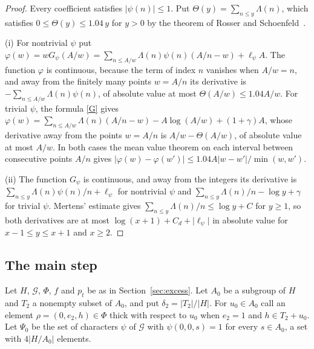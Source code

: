 \begin{proof}
Every coefficient satisfies $\lvert\psi(n)\rvert\le1$. Put $\Theta(y)=\sum_{n\le y}\Lambda(n)$, which satisfies $0\le\Theta(y)\le1.04\,y$ for $y>0$ by the theorem of Rosser and Schoenfeld~\cite[Theorem~12]{rosserschoenfeld}.

(i) For nontrivial $\psi$ put $\varphi(w)=wG_\psi(A/w)=\sum_{n\le A/w}\Lambda(n)\psi(n)(A/n-w)+\ell_\psi A$. The function $\varphi$ is continuous, because the term of index $n$ vanishes when $A/w=n$, and away from the finitely many points $w=A/n$ its derivative is $-\sum_{n\le A/w}\Lambda(n)\psi(n)$, of absolute value at most $\Theta(A/w)\le1.04A/w$. For trivial $\psi$, the formula \eqref{G} gives $\varphi(w)=\sum_{n\le A/w}\Lambda(n)(A/n-w)-A\log(A/w)+(1+\gamma)A$, whose derivative away from the points $w=A/n$ is $A/w-\Theta(A/w)$, of absolute value at most $A/w$. In both cases the mean value theorem on each interval between consecutive points $A/n$ gives $\lvert\varphi(w)-\varphi(w')\rvert\le1.04A\lvert w-w'\rvert/\min(w,w')$.

(ii) The function $G_\psi$ is continuous, and away from the integers its derivative is $\sum_{n\le y}\Lambda(n)\psi(n)/n+\ell_\psi$ for nontrivial $\psi$ and $\sum_{n\le y}\Lambda(n)/n-\log y+\gamma$ for trivial $\psi$. Mertens' estimate gives $\sum_{n\le y}\Lambda(n)/n\le\log y+C$ for $y\ge1$, so both derivatives are at most $\log(x+1)+C_d+\lvert\ell_\psi\rvert$ in absolute value for $x-1\le y\le x+1$ and $x\ge2$.
\end{proof}

\subsection{The main step}\label{sec:step5}

Let $H$, $\mathcal G$, $\Phi$, $f$ and $p_t$ be as in Section~\ref{sec:excess}. Let $A_0$ be a subgroup of $H$ and $T_2$ a nonempty subset of $A_0$, and put $\delta_2=\lvert T_2\rvert/\lvert H\rvert$. For $u_0\in A_0$ call an element $\rho=(0,e_2,h)\in\Phi$ thick with respect to $u_0$ when $e_2=1$ and $h\in T_2+u_0$. Let $\Psi_0$ be the set of characters $\psi$ of $\mathcal G$ with $\psi(0,0,s)=1$ for every $s\in A_0$, a set with $4\lvert H/A_0\rvert$ elements.

